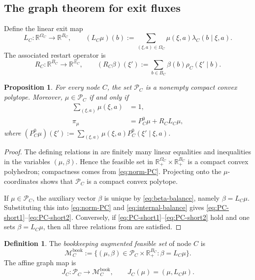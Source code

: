 \documentclass[12pt]{article}
\newtheorem{proposition}[theorem]{Proposition}
\theoremstyle{definition}
\newtheorem{definition}[theorem]{Definition}
\newcommand{\R}{\mathbb{R}}
\newcommand{\1}{\mathbf{1}}
\newcommand{\cM}{\mathcal{M}}
\newcommand{\cP}{\mathcal{P}}
\begin{document}
\subsection{The graph theorem for exit fluxes}

Define the linear exit map
\begin{equation}
\label{eq:LC-def}
L_C:\R^{\Omega_C}\to \R^{B_C},
\qquad
(L_C\mu)(b):=
\sum_{(\xi,a)\in\Omega_C}\mu(\xi,a)\lambda_C(b\mid\xi,a).
\end{equation}
The associated restart operator is
\begin{equation}
\label{eq:RC-def}
R_C:\R^{B_C}\to \R^{\Xi_C},
\qquad
(R_C\beta)(\xi'):=\sum_{b\in B_C}\beta(b)\rho_C(\xi'\mid b).
\end{equation}


\begin{proposition}
\label{prop:PC-polytope}
For every node $C$, the set $\cP_C$ is a nonempty compact convex polytope.
Moreover, $\mu\in\cP_C$ if and only if
\begin{align}
\sum_{(\xi,a)}\mu(\xi,a)&=1,
\label{eq:PC-short1}
\\
\pi_\mu &= P_C^0\mu + R_C L_C\mu,
\label{eq:PC-short2}
\end{align}
where $(P_C^0\mu)(\xi'):=\sum_{(\xi,a)}\mu(\xi,a)P_C^0(\xi'\mid\xi,a)$.
\end{proposition}

\begin{proof}
The defining relations in  are finitely many linear equalities and
inequalities in the variables $(\mu,\beta)$. Hence the feasible set in
$\R_+^{\Omega_C}\times\R_+^{B_C}$ is a compact convex polyhedron; compactness
comes from \eqref{eq:norm-PC}. Projecting onto the $\mu$-coordinates shows that
$\cP_C$ is a compact convex polytope.

If $\mu\in\cP_C$, the auxiliary vector $\beta$ is unique by
\eqref{eq:beta-balance}, namely $\beta=L_C\mu$. Substituting this into
\eqref{eq:norm-PC} and \eqref{eq:internal-balance} gives
\eqref{eq:PC-short1}--\eqref{eq:PC-short2}. Conversely, if
\eqref{eq:PC-short1}--\eqref{eq:PC-short2} hold and one sets $\beta=L_C\mu$, then
all three relations from  are satisfied.
\end{proof}


\begin{definition}
\label{def:MCbook}
The \emph{bookkeeping augmented feasible set} of node $C$ is
\[
\cM_C^{\mathrm{book}}
:=
\{(\mu,\beta)\in\cP_C\times\R_+^{B_C}:\beta=L_C\mu\}.
\]
The affine graph map is
\[
J_C:\cP_C\to \cM_C^{\mathrm{book}},
\qquad J_C(\mu)=(\mu,L_C\mu).
\]
\end{definition}
\end{document}
